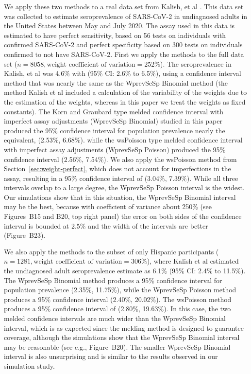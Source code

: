 \documentclass[AMA,STIX1COL]{WileyNJD-v2}
\begin{document}
We  apply these two methods to a real data set from
Kalish, et al \cite{Kali:2021}.
This data set was collected to estimate seroprevalence of SARS-CoV-2 in undiagnosed adults in the United States between May and July 2020.
The assay used in this data is estimated to have perfect sensitivity, based on 56 tests on individuals with confirmed SARS-CoV-2 and perfect specificity based on 300 tests on individuals confirmed to not have SARS-CoV-2.
First we apply the methods to the full data set (\( n =  8058, \text{weight coefficient of variation} = 252\%\)).
The seroprevalence in Kalish, et al was 4.6\% with (95\% CI: 2.6\% to 6.5\%), using a confidence interval method that was nearly the same as the WprevSeSp Binomial method (the method Kalish et al  included a calculation of the variability of the weights due to the estimation of the weights, whereas in this paper we treat the weights as fixed constants).   
The Korn and Graubard type melded confidence interval with imperfect assay adjustments (WprevSeSp Binomial) studied in this paper produced the 95\% confidence interval for population prevalence nearly the equivalent, (2.53\%, 6.68\%). while the wsPoisson type melded confidence interval with imperfect assay adjustments (WprevSeSp Poisson) produced the 95\% confidence interval (2.56\%, 7.54\%).
We also apply the wsPoisson method from Section~\ref{sec:weight-perfect}, which does not account for imperfections in the assay, resulting in a 95\% confidence interval of (3.04\%, 7.39\%).
While all three intervals overlap to a large degree, the WprevSeSp Poisson interval is the widest.
Our simulations show that in this situation, the WprevSeSp Binomial interval may be the best, because with coefficient of variance about 250\% (see Figures~B15 and B20, top right panel) the error on both sides of the confidence interval is bounded at 2.5\% and the width of the intervals are better (Figure~B23).  


We also apply the methods to the subset of only Hispanic participants (\( n = 1281, \text{weight coefficient of variation} = 306\% \)), where Kalish et al estimated the undiagnosed adult seroprevalence estimate as 6.1\% (95\% CI: 2.4\% to 11.5\%).
The WprevSeSp Binomial method produces a 95\% confidence interval for population prevalence (2.35\%, 11.75\%), while the WprevSeSp Poisson method produces a 95\% confidence interval (2.40\%, 20.02\%).
The wsPoisson method produces a 95\% confidence interval of (2.80\%, 19.63\%).
In this case, the two melded confidence intervals are much wider than the WprevSeSp Binomial interval, which is as expected since the melding method is designed to guarantee coverage, although the simulations show that the WprevSeSp Binomial interval may be reasonable (see e.g., Figure~B20).
The smaller WprevSeSp Binomial interval is also unsurprising and is similar to the results observed in our simulation study.
\end{document}
